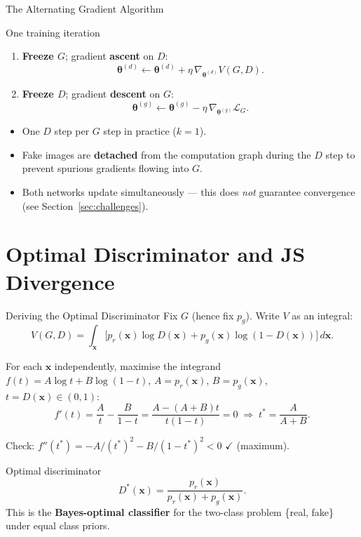 \documentclass[aspectratio=169,11pt]{beamer}
\newcommand{\bx}{\bm{x}}
\newcommand{\btheta}{\bm{\theta}}
\newcommand{\pr}{p_{r}}           %
\newcommand{\pg}{p_{g}}           %
\begin{document}
\begin{frame}{The Alternating Gradient Algorithm}
  \begin{block}{One training iteration}
    \begin{enumerate}
      \setlength\itemsep{4pt}
      \item \textbf{Freeze $G$}; gradient \textbf{ascent} on $D$:
            \[
              \btheta^{(d)} \leftarrow \btheta^{(d)}
              + \eta\,\nabla_{\btheta^{(d)}}V(G,D).
            \]

      \item \textbf{Freeze $D$}; gradient \textbf{descent} on $G$:
            \[
              \btheta^{(g)} \leftarrow \btheta^{(g)}
              - \eta\,\nabla_{\btheta^{(g)}}\mathcal{L}_G.
            \]
    \end{enumerate}
  \end{block}

  \medskip
  \begin{itemize}
    \item One $D$ step per $G$ step in practice ($k=1$).
    \item Fake images are \textbf{detached} from the computation graph during
          the $D$ step to prevent spurious gradients flowing into $G$.
    \item Both networks update simultaneously — this does \emph{not} guarantee
          convergence (see Section~\ref{sec:challenges}).
  \end{itemize}
\end{frame}

\section{Optimal Discriminator and JS Divergence}

\begin{frame}{Deriving the Optimal Discriminator}
\small
  Fix $G$ (hence fix $\pg$). Write $V$ as an integral:
  \[
    V(G,D) = \int_{\bx}
    \bigl[\pr(\bx)\log D(\bx) + \pg(\bx)\log(1-D(\bx))\bigr]\,d\bx.
  \]

  \smallskip
  For each $\bx$ independently, maximise the integrand
  $f(t)=A\log t+B\log(1-t)$, $A=\pr(\bx)$, $B=\pg(\bx)$, $t=D(\bx)\in(0,1)$:
  \[
    f'(t) = \frac{A}{t} - \frac{B}{1-t}
    = \frac{A-(A+B)t}{t(1-t)} = 0
    \;\Longrightarrow\; t^* = \frac{A}{A+B}.
  \]

  Check: $f''(t^*) = -A/(t^*)^2 - B/(1-t^*)^2 < 0$ \; $\checkmark$ (maximum).

  \begin{block}{Optimal discriminator}
    \[
      \boxed{D^*(\bx) = \frac{\pr(\bx)}{\pr(\bx)+\pg(\bx)}.}
    \]
    This is the \textbf{Bayes-optimal classifier} for the two-class problem
    \{real, fake\} under equal class priors.
  \end{block}
\end{frame}
\end{document}
